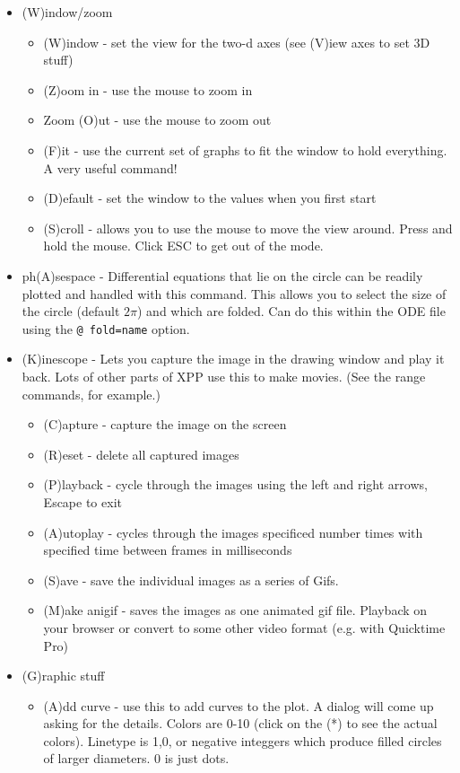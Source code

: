 \documentclass{article}
\begin{document}
\begin{itemize}
\begin{itemize}
\end{itemize}
\item (W)indow/zoom 
\begin{itemize}
\item (W)indow - set the view for the two-d axes (see (V)iew axes to set 3D stuff)
\item (Z)oom in - use the mouse to zoom in
\item Zoom (O)ut - use the mouse to zoom out
\item (F)it - use the current set of graphs to fit the window to hold everything. A very useful command!
\item (D)efault - set the window to the values when you first start
\item (S)croll  -  allows you to use the mouse to move the view around. Press and hold the mouse.  Click ESC to get out of the mode. 
\end{itemize}
\item ph(A)sespace - Differential equations that lie on the circle can be readily plotted and handled with this command. This allows you to select the size of the circle (default $2\pi$) and which are folded. Can do this within the ODE file using the {\tt @ fold=name} option.
\item (K)inescope - Lets you capture the image in the drawing window and play it back. Lots of other parts of XPP use this to make movies. (See the range commands, for example.) 
\begin{itemize}
\item (C)apture - capture the image on the screen
\item (R)eset - delete all captured images
\item (P)layback - cycle through the images using the left and right arrows, Escape to exit
\item (A)utoplay - cycles through the images specificed number times with specified time between frames in milliseconds
\item (S)ave - save the individual images as a series of Gifs. 
\item (M)ake anigif - saves the images as one animated gif file. Playback on your browser or convert to some other video format (e.g. with Quicktime Pro)
\end{itemize}
\item (G)raphic stuff 
\begin{itemize}
\item (A)dd curve - use this to add curves to the plot. A dialog will come up asking for the details. Colors are 0-10 (click on the (*) to see the actual colors). Linetype is 1,0, or negative integgers which produce filled circles of larger diameters. 0 is just dots.

\end{itemize}
\end{itemize}
\end{document}
